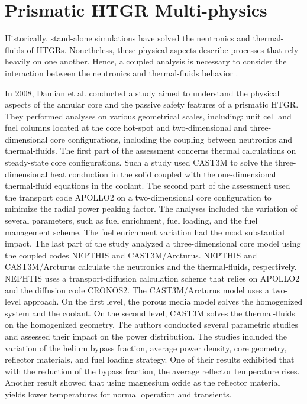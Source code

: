 \section{Prismatic HTGR Multi-physics}

Historically, stand-alone simulations have solved the neutronics and thermal-fluids of \glspl{HTGR}.
Nonetheless, these physical aspects describe processes that rely heavily on one another.
Hence, a coupled analysis is necessary to consider the interaction between the neutronics and thermal-fluids behavior \cite{tak_cappgamma_2016}.

In 2008, Damian et al. \cite{damian_vhtr_2008} conducted a study aimed to understand the physical aspects of the annular core and the passive safety features of a prismatic \gls{HTGR}.
They performed analyses on various geometrical scales, including: unit cell and fuel columns located at the core hot-spot and two-dimensional and three-dimensional core configurations, including the coupling between neutronics and thermal-fluids.
The first part of the assessment concerns thermal calculations on steady-state core configurations.
Such a study used CAST3M \cite{studer_cast3marcturus_2007} to solve the three-dimensional heat conduction in the solid coupled with the one-dimensional thermal-fluid equations in the coolant.
The second part of the assessment used the transport code APOLLO2 \cite{sanchez_apollo2_1999} on a two-dimensional core configuration to minimize the radial power peaking factor.
The analyses included the variation of several parameters, such as fuel enrichment, fuel loading, and the fuel management scheme.
The fuel enrichment variation had the most substantial impact.
The last part of the study analyzed a three-dimensional core model using the coupled codes NEPTHIS \cite{cavalier_presentation_2005} and CAST3M/Arcturus.
NEPTHIS and CAST3M/Arcturus calculate the neutronics and the thermal-fluids, respectively.
NEPHTIS uses a transport-diffusion calculation scheme that relies on APOLLO2 and the diffusion code CRONOS2.
The CAST3M/Arcturus model uses a two-level approach.
On the first level, the porous media model solves the homogenized system and the coolant.
On the second level, CAST3M solves the thermal-fluids on the homogenized geometry.
The authors conducted several parametric studies and assessed their impact on the power distribution.
The studies included the variation of the helium bypass fraction, average power density, core geometry, reflector materials, and fuel loading strategy.
One of their results exhibited that with the reduction of the bypass fraction, the average reflector temperature rises.
Another result showed that using magnesium oxide as the reflector material yields lower temperatures for normal operation and transients.

